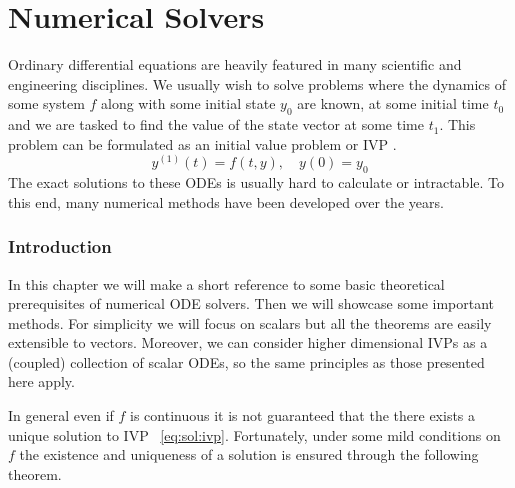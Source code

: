 \documentclass[11pt]{report}
\begin{document}
    \chapter{Numerical Solvers}
    Ordinary differential equations are heavily featured in many scientific and engineering disciplines.
    We usually wish to solve problems where the dynamics of some system $f$ along with some initial state $y_0$ are
    known, at some initial time $t_0$ and we are tasked to find the value of the state vector at some time $t_1$.
    This problem can be formulated as an initial value problem or IVP .
    \begin{equation}
        \label{eq:sol:ivp}
        y^{(1)}(t) = f(t, y), \quad y(0) = y_0
    \end{equation}
    The exact solutions to these ODEs is usually hard to calculate or intractable.
    To this end, many numerical methods have been developed over the years.

    \subsection{Introduction}
    In this chapter we will make a short reference to some basic theoretical prerequisites of numerical ODE solvers.
    Then we will showcase some important methods.
    For simplicity we will focus on scalars but all the theorems are easily extensible to vectors.
    Moreover, we can consider higher dimensional IVPs as a (coupled) collection of scalar ODEs, so the same principles as
    those presented here apply.

    In general even if $f$ is continuous it is not guaranteed that the there exists a unique solution to IVP
    ~\eqref{eq:sol:ivp}.
    Fortunately, under some mild conditions on $f$ the existence and uniqueness of a solution is ensured through the
    following theorem.
\end{document}
